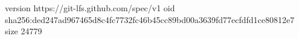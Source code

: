version https://git-lfs.github.com/spec/v1
oid sha256:ded247ad967465d8c4fc7732fc46b45cc89bd00a3639fd77ecfdfd1ce80812e7
size 24779
